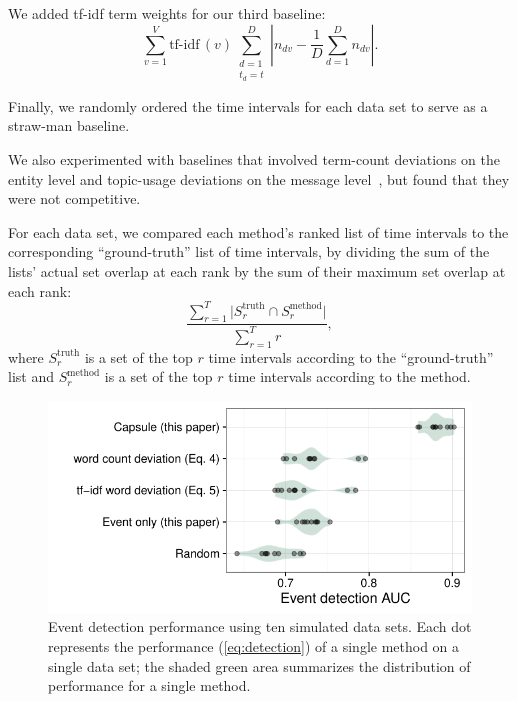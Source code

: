 We added tf-idf term weights for our third baseline:
\begin{equation}
  \sum_{v=1}^V \textrm{tf-idf}\,(v)
  \sum_{\substack{d=1\\t_d\!=\!t}}^D \left\lvert n_{dv} - \frac{1}{D}\sum_{d=1}^D
  n_{dv} \right\rvert.
\label{eq:tfidfwordev}
\end{equation}

Finally, we randomly ordered the time intervals for each data set to
serve as a straw-man baseline.

We also experimented with baselines that involved term-count
deviations on the entity level and topic-usage deviations on the
message level~\cite{dou2012leadline}, but found that they were not
competitive.

For each data set, we compared each method's ranked list of time
intervals to the corresponding ``ground-truth'' list of time
intervals, by dividing the sum of the lists' actual set overlap at
each rank by the sum of their maximum set overlap at each rank:
\begin{equation}
\frac{\sum_{r=1}^T \vert S^{\textrm{truth}}_r \cap
  S^{\textrm{method}}_r \vert}{\sum_{r=1}^T r},
\label{eq:detection}
\end{equation}
where $S^{\textrm{truth}}_r$ is a set of the top $r$ time intervals
according to the ``ground-truth'' list and $S^{\textrm{method}}_r$ is
a set of the top $r$ time intervals according to the method.

\begin{figure}[t]
\centering
\includegraphics[width=\linewidth]{fig/sim_eventdetect.pdf}
\caption{Event detection performance using ten simulated data
  sets. Each dot represents the performance (\cref{eq:detection}) of
  a single method on a single data set; the shaded green area
  summarizes the distribution of performance for a single method.}
\label{fig:sim_eventdetect}
\end{figure}


